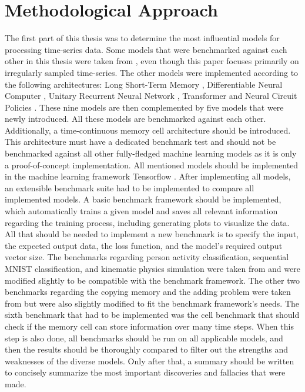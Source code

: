 \documentclass[draft,final]{vutinfth} %
\begin{document}
    \section{Methodological Approach}
    The first part of this thesis was to determine the most influential models for processing time-series data.
    Some models that were benchmarked against each other in this thesis were taken from \cite{ODELSTM}, even though this paper focuses primarily on irregularly sampled time-series.
    The other models were implemented according to the following architectures: Long Short-Term Memory \cite{LSTM}, Differentiable Neural Computer \cite{DNC}, Unitary Recurrent Neural Network \cite{EfficientUnitaryRNNs}, Transformer \cite{Transformer} and Neural Circuit Policies \cite{NCP}.
    These nine models are then complemented by five models that were newly introduced.
    All these models are benchmarked against each other.
    Additionally, a time-continuous memory cell architecture should be introduced.
    This architecture must have a dedicated benchmark test and should not be benchmarked against all other fully-fledged machine learning models as it is only a proof-of-concept implementation.
    All mentioned models should be implemented in the machine learning framework Tensorflow \cite{Tensorflow}.
    After implementing all models, an extensible benchmark suite had to be implemented to compare all implemented models.
    A basic benchmark framework should be implemented, which automatically trains a given model and saves all relevant information regarding the training process, including generating plots to visualize the data.
    All that should be needed to implement a new benchmark is to specify the input, the expected output data, the loss function, and the model's required output vector size.
    The benchmarks regarding person activity classification, sequential MNIST classification, and kinematic physics simulation were taken from \cite{ODELSTM} and were modified slightly to be compatible with the benchmark framework.
    The other two benchmarks regarding the copying memory and the adding problem were taken from \cite{UnitaryRNNs} but were also slightly modified to fit the benchmark framework's needs.
    The sixth benchmark that had to be implemented was the cell benchmark that should check if the memory cell can store information over many time steps.
    When this step is also done, all benchmarks should be run on all applicable models, and then the results should be thoroughly compared to filter out the strengths and weaknesses of the diverse models.
    Only after that, a summary should be written to concisely summarize the most important discoveries and fallacies that were made.
\end{document}
